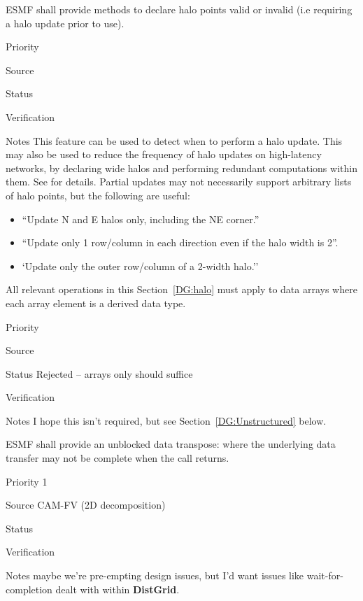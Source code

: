 ESMF shall provide methods to declare halo points valid or invalid
(i.e requiring a halo update prior to use).

\begin{reqlist}
\item[Priority]
\item[Source]
\item[Status]
\item[Verification]
\item[Notes] This feature can be used to detect when to perform a halo
  update. This may also be used to reduce the frequency of halo
  updates on high-latency networks, by declaring wide halos and
  performing redundant computations within them. See \cite{ref:b2001}
  for details. Partial updates may not necessarily support
  arbitrary lists of halo points, but the following are useful:
  \begin{itemize}
  \item ``Update N and E halos only, including the NE corner.''
  \item ``Update only 1 row/column in each direction even if the halo
    width is 2''.
  \item `Update only the outer row/column of a 2-width halo.''
  \end{itemize}
\end{reqlist}


All relevant operations in this Section~\ref{DG:halo} must apply to
data arrays where each array element is a derived data type.

\begin{reqlist}
\item[Priority]
\item[Source]
\item[Status] Rejected -- arrays only should suffice
\item[Verification]
\item[Notes] I hope this isn't required, but see
  Section~\ref{DG:Unstructured} below.
\end{reqlist}

 \label{DG:transpose}


ESMF shall provide an unblocked data transpose: where the underlying
data transfer may not be complete when the call returns.

\begin{reqlist}
\item[Priority] 1
\item[Source] CAM-FV (2D decomposition)
\item[Status]
\item[Verification]
\item[Notes] maybe we're pre-empting design issues, but I'd want
  issues like wait-for-completion dealt with within \textbf{DistGrid}.
\end{reqlist}

